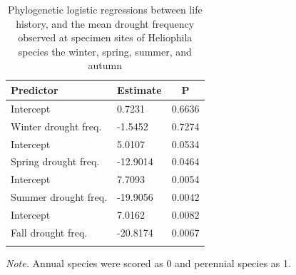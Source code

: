 \documentclass[man,floatsintext]{apa6}
\theoremstyle{definition}
\theoremstyle{definition}
\theoremstyle{definition}
\theoremstyle{remark}
\begin{document}
\begin{table}[tbp]
\begin{center}
\begin{threeparttable}
\caption{\label{tab:modelstable}Phylogenetic logistic regressions between life history, and the mean drought frequency observed at specimen sites of Heliophila species the winter, spring, summer, and autumn}
\begin{tabular}{lll}
\toprule
Predictor & \multicolumn{1}{c}{Estimate} & \multicolumn{1}{c}{P}\\
\midrule
Intercept & 0.7231 & 0.6636\\
Winter drought freq. & -1.5452 & 0.7274\\ \midrule
Intercept & 5.0107 & 0.0534\\
Spring drought freq. & -12.9014 & 0.0464\\ \midrule
Intercept & 7.7093 & 0.0054\\
Summer drought freq. & -19.9056 & 0.0042\\ \midrule
Intercept & 7.0162 & 0.0082\\
Fall drought freq. & -20.8174 & 0.0067\\ \midrule
\bottomrule
\addlinespace
\end{tabular}
\begin{tablenotes}[para]
\normalsize{\textit{Note.} Annual species were scored as 0 and perennial species as 1.}
\end{tablenotes}
\end{threeparttable}
\end{center}
\end{table}
\end{document}
